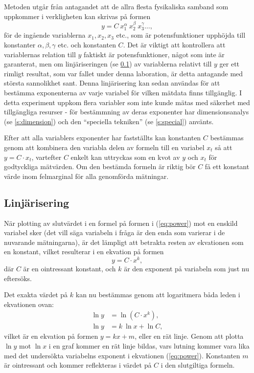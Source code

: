 \documentclass[a4paper]{article}
\begin{document}
Metoden utgår från antagandet att de allra flesta fysikaliska samband som uppkommer i verkligheten kan skrivas på formen
%
\begin{equation}
    \label{eq:power}
    y = C ~ x_1^\alpha ~ x_2^\beta ~ x_3^\gamma \ldots,
\end{equation}
%
för de ingående variablerna $x_1, x_2, x_3$ etc., som är potensfunktioner upphöjda till konstanter $\alpha, \beta, \gamma$ etc. och konstanten $C$. Det är viktigt att kontrollera att variablernas relation till $y$ faktiskt är potensfunktioner, något som inte är garanterat, men om linjäriseringen (se \ref{s:linear}) av variablerna relativt till $y$ ger ett rimligt resultat, som var fallet under denna laboration, är detta antagande med största sannolikhet sant. Denna linjärisering kan sedan användas för att bestämma exponenterna av varje variabel för vilken mätdata finns tillgänglig. I detta experiment uppkom flera variabler som inte kunde mätas med säkerhet med tillgängliga resurser - för bestämmning av deras exponenter har dimensionsanalys (se \ref{s:dimension}) och den ``speciella tekniken'' (se \ref{s:special}) använts.

Efter att alla variablers exponenter har fastställts kan konstanten $C$ bestämmas genom att kombinera den variabla delen av formeln till en variabel $x_t$ så att $y = C \cdot x_t$, vartefter $C$ enkelt kan uttryckas som en kvot av $y$ och $x_t$ för godtyckliga mätvärden. Om den bestämda formeln är riktig bör $C$ få ett konstant värde inom felmarginal för alla genomförda mätningar.

\subsection{Linjärisering}\label{s:linear}

När plotting av slutvärdet i en formel på formen i (\ref{eq:power}) mot en enskild variabel sker (det vill säga variabeln i fråga är den enda som varierar i de nuvarande mätningarna), är det lämpligt att betrakta resten av ekvationen som en konstant, vilket resulterar i en ekvation på formen
%
\begin{equation}
    y = C \cdot x^k,
\end{equation}
%
där $C$ är en ointressant konstant, och $k$ är den exponent på variabeln som just nu eftersöks.

Det exakta värdet på $k$ kan nu bestämmas genom att logaritmera båda leden i ekvationen ovan:
%
\begin{align}
    \ln y &= \ln (C \cdot x^k), \\
    \ln y &= k ~ \ln x + \ln C ,
\end{align}
%
vilket är en ekvation på formen $y = kx + m$, eller en rät linje. Genom att plotta $\ln y$ mot $\ln x$ i en graf kommer en rät linje bildas, vars lutning kommer vara lika med det undersökta variabelns exponent i ekvationen (\ref{eq:power}). Konstanten $m$ är ointressant och kommer reflekteras i värdet på $C$ i den slutgiltiga formeln.
\end{document}
